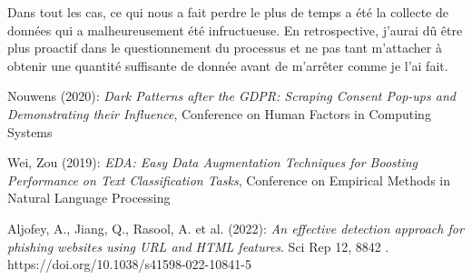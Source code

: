 \documentclass[oneside,a4paper,12pt]{article}
\begin{document}
	Dans tout les cas, ce qui nous a fait perdre le plus de temps a été la collecte de données qui a malheureusement été infructueuse. En retrospective, j'aurai dû être plus proactif dans le questionnement du processus et ne pas tant m'attacher à obtenir une quantité suffisante de donnée avant de m'arrêter comme je l'ai fait.
	
	\newpage
	
	\begin{thebibliography}{9}
		 Nouwens (2020): \emph{Dark Patterns after the GDPR: Scraping
Consent Pop-ups and Demonstrating their Influence}, Conference on Human Factors in Computing Systems
		
		 Wei, Zou (2019): \emph{{EDA}: Easy Data Augmentation Techniques for Boosting Performance on Text Classification Tasks}, Conference on Empirical Methods in Natural Language Processing
		
		 Aljofey, A., Jiang, Q., Rasool, A. et al. (2022): \emph{An effective detection approach for phishing websites using URL and HTML features}. Sci Rep 12, 8842 . https://doi.org/10.1038/s41598-022-10841-5 
	\end{thebibliography}
\end{document}
